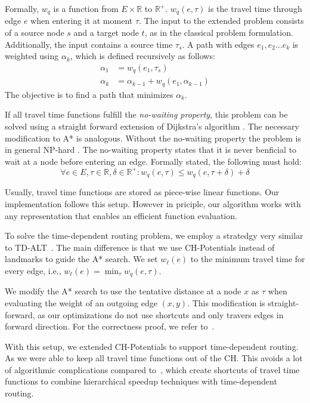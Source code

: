 \documentclass[letterpaper]{article} %
\begin{document}
Formally, $w_q$ is a function from $E\times \mathbb{R}$ to $\mathbb{R}^+$.
$w_q(e, \tau)$ is the travel time through edge $e$ when entering it at moment $\tau$.
The input to the extended problem consists of a source node $s$ and a target node $t$, as in the classical problem formulation.
Additionally, the input contains a source time $\tau_s$.
A path with edges $e_1,e_2\ldots e_k$ is weighted using $\alpha_k$, which is defined recursively as follows:\[
\begin{split}
\alpha_{1} & = w_q(e_1, \tau_s) \\
\alpha_{k} & = \alpha_{k-1} + w_q(e_1, \alpha_{k-1})
\end{split}
\]
The objective is to find a path that minimizes $\alpha_k$.

If all travel time functions fulfill the \emph{no-waiting property}, this problem can be solved using a straight forward extension of Dijkstra's algorithm \cite{td-alt?}.
The necessary modification to A* is analogous.
Without the no-waiting property the problem is in general NP-hard \cite{veit}.
The no-waiting property states that it is never benficial to wait at a node before entering an edge.
Formally stated, the following must hold:\[
\forall e\in E,\tau\in \mathbb{R},\delta\in \mathbb{R}^+: w_q(e, \tau) \le w_q(e, \tau+\delta) + \delta
\]

Usually, travel time functions are stored as piece-wise linear functions.
Our implementation follows this setup.
However in priciple, our algorithm works with any representation that enables an efficient function evaluation.

To solve the time-dependent routing problem, we employ a stratedgy very similar to TD-ALT~\cite{td-alt}.
The main difference is that we use CH-Potentials instead of landmarks to guide the A* search.
We set $w_\ell(e)$ to the minimum travel time for every edge, i.e., $w_\ell(e) = \min_\tau w_q(e,\tau)$.

We modify the A* search to use the tentative distance at a node $x$ as $\tau$ when evaluating the weight of an outgoing edge $(x,y)$.
This modification is straight-forward, as our optimizations do not use shortcuts and only travers edges in forward direction.
For the correctness proof, we refer to~\cite{td-alt?}.

With this setup, we extended CH-Potentials to support time-dependent routing.
As we were able to keep all travel time functions out of the CH.
This avoids a lot of algorithmic complications compared to~\cite{TD-CH,CatchUp,TD-CRP}, which create shortcuts of travel time functions to combine hierarchical speedup techniques with time-dependent routing.
\end{document}
